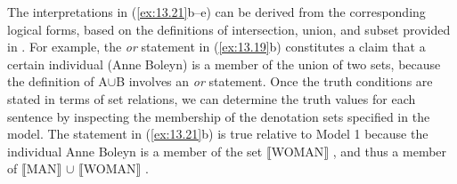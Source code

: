 
The interpretations in (\ref{ex:13.21}b--e) can be derived from the corresponding logical forms, based on the definitions of intersection, union, and subset provided in . For example, the \textit{or} statement in (\ref{ex:13.19}b) constitutes a claim that a certain individual (Anne Boleyn) is a member of the union of two sets, because the definition of A${\cup}$B involves an \textit{or} statement. Once the truth conditions are stated in terms of set relations, we can determine the truth values for each sentence by inspecting the membership of the denotation sets specified in the model. The statement in (\ref{ex:13.21}b) is true relative to Model 1 because the individual Anne Boleyn is a member of the set $\llbracket$WOMAN$\rrbracket$ , and thus a member of $\llbracket$MAN$\rrbracket$  ${\cup}$ $\llbracket$WOMAN$\rrbracket$ .


